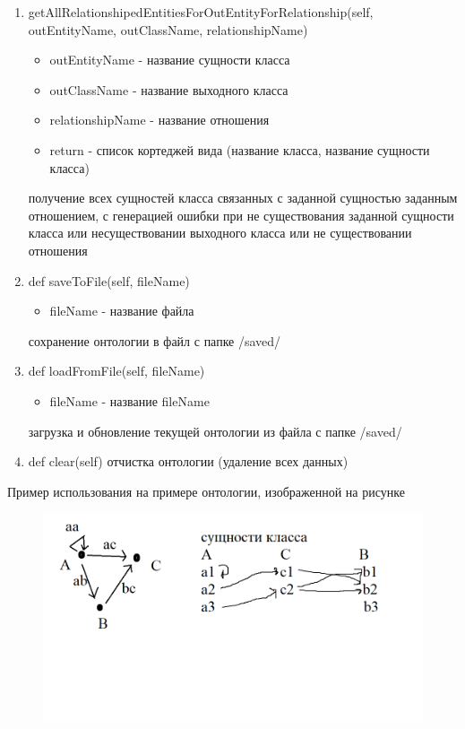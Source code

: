 \documentclass{article}
\begin{document}
\begin{enumerate}
	\item getAllRelationshipedEntitiesForOutEntityForRelationship(self, outEntityName, outClassName, relationshipName)
	\begin{itemize}
		\item outEntityName - название сущности класса
		\item outClassName - название выходного класса
		\item relationshipName - название отношения
		\item return - список кортеджей вида (название класса, название сущности класса)
	\end{itemize}
	получение всех сущностей класса связанных с заданной сущностью заданным отношением, с генерацией ошибки при не существования заданной сущности класса или несуществовании выходного класса или не существовании отношения
	
	\item def saveToFile(self, fileName)
	\begin{itemize}
		\item fileName - название файла
	\end{itemize}
	сохранение онтологии в файл с папке /saved/
	
	\item def loadFromFile(self, fileName)
	\begin{itemize}
		\item fileName - название fileName
	\end{itemize}
	загрузка и обновление текущей онтологии из файла с папке /saved/
	
	\item def clear(self)
	отчистка онтологии (удаление всех данных)
	
	\end{enumerate}
	
	Пример использования на примере онтологии, изображенной на рисунке
	\begin{figure}[!h]
		\begin{center}
			\includegraphics[scale=0.5]{example.png}
		\end{center}
	\end{figure}
	
\end{document}
